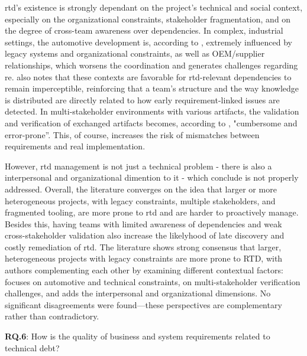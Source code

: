 \documentclass[12pt,reqno, twoside]{amsbook}
\theoremstyle{plain}
\numberwithin{equation}{chapter}
\numberwithin{section}{chapter}
\begin{document}
\gls{rtd}'s existence is strongly dependant on the project's technical and social context, especially on the 
organizational constraints, stakeholder fragmentation, and on the degree of cross-team awareness over 
dependencies. In complex, industrial settings, the automotive development is, according to \textcite{Vogelsang2020}, 
extremely influenced by legacy systems and organizational constraints, as well as OEM/supplier relationships, which 
worsens the coordination and generates challenges regarding \gls{re}. \textcite{Vogelsang2020} also notes that these 
contexts are favorable for \gls{rtd}-relevant dependencies to remain imperceptible, reinforcing that a team's
structure and the way knowledge is distributed are directly related to how early requirement-linked issues are 
detected. In multi-stakeholder environments with various artifacts, the validation and 
verification of exchanged artifacts  becomes, according to \textcite{Waltersdorfer2020}, "cumbersome and error-prone”. 
This, of course, increases the risk of mismatches between requirements and real implementation.

However, \gls{rtd} management is not just a technical problem - there is also a interpersonal and organizational 
dimention to it - which \textcite{Melo2022} conclude is not properly addressed. 
Overall, the literature converges on the idea that larger or more heterogeneous projects, with legacy constraints, multiple stakeholders, and fragmented tooling,
are more prone to \gls{rtd} and are harder to proactively manage. Besides this, having teams with limited awareness of dependencies and weak cross-stakeholder 
validation also increase the likelyhood of late discovery and costly remediation of \gls{rtd}. The literature shows strong consensus that larger, heterogeneous projects with legacy constraints are more prone to RTD, with authors complementing each other by examining different contextual factors: \textcite{Vogelsang2020} focuses on automotive and technical constraints, \textcite{Waltersdorfer2020} on multi-stakeholder verification challenges, and \textcite{Melo2022} adds the interpersonal and organizational dimensions. No significant disagreements were found—these perspectives are complementary rather than contradictory.

\hspace*{\linewidth}\par
\noindent\textbf{RQ.6}: How is the quality of business and system requirements related to technical debt?
\end{document}
